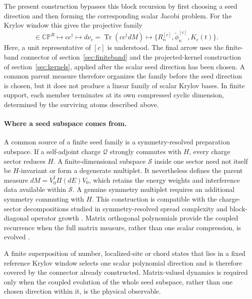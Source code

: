 \documentclass[a4paper,11pt]{article}
\def\dd{d}%
\theoremstyle{definition}
\theoremstyle{remark}
\newcommand{\dd}{\mathrm d}
\newcommand{\tphi}{\widetilde\phi}
\begin{document}
The present construction bypasses this block recursion by first choosing
a seed direction and then forming the corresponding scalar Jacobi
problem.  For the Krylov window this gives 
the projective family
\begin{equation}
   [c]\in\mathbb{CP}^{R}
   \longmapsto cc^\dagger
   \longmapsto
   \dd\nu_c=\operatorname{Tr}(cc^\dagger\dd M)
   \longmapsto
   \{R_n^{[c]},\tphi_n^{[c]},K_c(t)\}.
   \label{eq:matrix-parent-pipeline-main}
\end{equation}
Here, a unit representative of $[c]$ is understood.  
The final arrow uses the finite-band connector of
section~\ref{sec:finiteband} and the projected-kernel construction of
section~\ref{sec:kernels}, applied after the scalar seed direction has
been chosen. 
A common parent measure therefore organizes the family before the seed
direction is chosen, but it does not produce a linear family of scalar
Krylov bases.
In finite support, each member terminates at its own compressed cyclic
dimension, determined by the surviving atoms described above.

\paragraph{Where a seed subspace comes from.}
A common source of a finite seed family is a symmetry-resolved preparation subspace.  If a
self-adjoint charge $\mathcal Q$ strongly commutes with $H$, every charge sector reduces $H$.  A
finite-dimensional subspace $\mathcal S$ inside one sector need not itself be $H$-invariant or form
a degenerate multiplet.  It nevertheless defines the parent measure
$\dd M=V_0^\dagger\Pi(\dd E)V_0$, which retains the energy weights and interference data available
within $\mathcal S$.  A genuine symmetry multiplet requires an additional symmetry commuting with
$H$.  This construction is compatible with the charge-sector decompositions studied in
symmetry-resolved spread complexity and block-diagonal operator growth
\cite{CaputaDiGiulioLoc2025,CaputaDiGiulioLoc2025b}.  Matrix orthogonal polynomials provide the
coupled recurrence when the full matrix measure, rather than one scalar compression, is evolved
\cite{DuranVanAssche1995}.

A finite superposition of number, localized-site or chord states that lies in a fixed
reference Krylov window selects one scalar polynomial direction and is therefore covered by the
connector already constructed.  Matrix-valued dynamics is required only when the coupled
evolution of the whole seed subspace, rather than one chosen direction within it, is the physical
observable.
\end{document}
